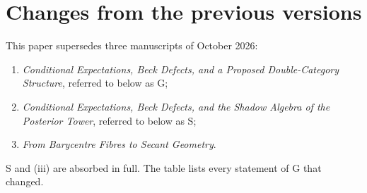 \documentclass[11pt]{article}
\theoremstyle{definition}
\begin{document}
\appendix
\section{Changes from the previous versions}\label{app:changes}
This paper supersedes three manuscripts of October 2026:
\begin{enumerate}[label=(\roman*)]
\item \emph{Conditional Expectations, Beck Defects, and a Proposed Double-Category Structure}, referred to below as G;
\item \emph{Conditional Expectations, Beck Defects, and the Shadow Algebra of the Posterior Tower}, referred to below as S;
\item \emph{From Barycentre Fibres to Secant Geometry}.
\end{enumerate}
S and (iii) are absorbed in full. The table lists every statement of G that changed.
\end{document}
